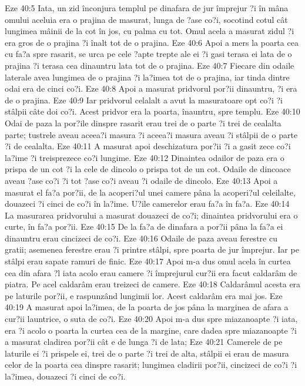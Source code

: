 Eze 40:5  Iata, un zid înconjura templul pe dinafara de jur împrejur ?i în mâna omului aceluia era o prajina de masurat, lunga de ?ase co?i, socotind cotul cât lungimea mâinii de la cot în jos, cu palma cu tot. Omul acela a masurat zidul ?i era gros de o prajina ?i înalt tot de o prajina.
Eze 40:6  Apoi a mers la poarta cea cu fa?a spre rasarit, se urca pe cele ?apte trepte ale ei ?i gasi terasa ei lata de o prajina ?i terasa cea dinauntru lata tot de o prajina.
Eze 40:7  Fiecare din odaile laterale avea lungimea de o prajina ?i la?imea tot de o prajina, iar tinda dintre odai era de cinci co?i.
Eze 40:8  Apoi a masurat pridvorul por?ii dinauntru, ?i era de o prajina.
Eze 40:9  Iar pridvorul celalalt a avut la masuratoare opt co?i ?i stâlpii câte doi co?i. Acest pridvor era la poarta, înauntru, spre templu.
Eze 40:10  Odai de paza la por?ile dinspre rasarit erau trei de o parte ?i trei de cealalta parte; tustrele aveau aceea?i masura ?i aceea?i masura aveau ?i stâlpii de o parte ?i de cealalta.
Eze 40:11  A masurat apoi deschizatura por?ii ?i a gasit zece co?i la?ime ?i treisprezece co?i lungime.
Eze 40:12  Dinaintea odailor de paza era o prispa de un cot ?i la cele de dincolo o prispa tot de un cot. Odaile de dincoace aveau ?ase co?i ?i tot ?ase co?i aveau ?i odaile de dincolo.
Eze 40:13  Apoi a masurat el fa?a por?ii, de la acoperi?ul unei camere pâna la acoperi?ul celeilalte, douazeci ?i cinci de co?i în la?ime. U?ile camerelor erau fa?a în fa?a.
Eze 40:14  La masurarea pridvorului a masurat douazeci de co?i; dinaintea pridvorului era o curte, în fa?a por?ii.
Eze 40:15  De la fa?a de dinafara a por?ii pâna la fa?a ei dinauntru erau cincizeci de co?i.
Eze 40:16  Odaile de paza aveau ferestre cu gratii; asemenea ferestre erau ?i printre stâlpi, spre poarta de jur împrejur. Iar pe stâlpi erau sapate ramuri de finic.
Eze 40:17  Apoi m-a dus omul acela în curtea cea din afara ?l iata acolo erau camere ?i împrejurul cur?ii era facut caldarâm de piatra. Pe acel caldarâm erau treizeci de camere.
Eze 40:18  Caldarâmul acesta era pe laturile por?ii, e raspunzând lungimii lor. Acest caldarâm era mai jos.
Eze 40:19  A masurat apoi la?imea, de la poarta de jos pâna la marginea de afara a cur?ii launtrice, o suta de co?i.
Eze 40:20  Apoi m-a dus spre miazanoapte ?i iata, era ?i acolo o poarta la curtea cea de la margine, care dadea spre miazanoapte ?i a masurat cladirea por?ii cât e de lunga ?i de lata;
Eze 40:21  Camerele de pe laturile ei ?i prispele ei, trei de o parte ?i trei de alta, stâlpii ei erau de masura celor de la poarta cea dinspre rasarit; lungimea cladirii por?ii, cincizeci de co?i ?i la?imea, douazeci ?i cinci de co?i.
